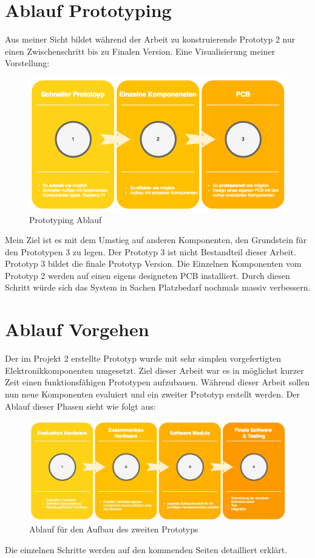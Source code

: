 \documentclass[11pt,english,german]{report}
\theoremstyle{definition}
\begin{document}
\section{Ablauf Prototyping}
Aus meiner Sicht bildet während der Arbeit zu konstruierende Prototyp 2 nur einen Zwischenschritt bis zu Finalen Version. Eine Visualisierung meiner Vorstellung:\\
\begin{figure}[H]
	\centering
	\includegraphics[width=\textwidth]{img/projectFlow_Prototype.png}
	\caption[Prototyping Ablauf]
	{Prototyping Ablauf}
\end{figure}
\noindent
Mein Ziel ist es mit dem Umstieg auf anderen Komponenten, den Grundstein für den Prototypen 3 zu legen. Der Prototyp 3 ist nicht Bestandteil dieser Arbeit. Prototyp 3 bildet die finale Prototyp Version. Die Einzelnen Komponenten vom Prototyp 2 werden auf einen eigens designeten PCB installiert. Durch diesen Schritt würde sich das System in Sachen Platzbedarf nochmals massiv verbessern.

\newpage
\section{Ablauf Vorgehen}
Der im Projekt 2 erstellte Prototyp wurde mit sehr simplen vorgefertigten Elektronikkomponenten umgesetzt. Ziel dieser Arbeit war es in möglichst kurzer Zeit einen funktionsfähigen Prototypen aufzubauen. Während dieser Arbeit sollen nun neue Komponenten evaluiert und ein zweiter Prototyp erstellt werden. Der Ablauf dieser Phasen sieht wie folgt aus:\\[0.3cm]

\begin{figure}[H]
	\centering
	\includegraphics[width=\textwidth]{img/projectFlow_hardware.jpg}
	\caption[Flowchart Prototyp 2]
	{Ablauf für den Aufbau des zweiten Prototyps}
\end{figure}
\noindent
Die einzelnen Schritte werden auf den kommenden Seiten detailliert erklärt.
\end{document}

